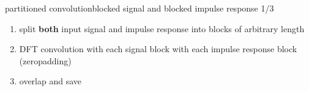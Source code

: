 \begin{frame}{partitioned convolution}{blocked signal and blocked impulse response 1/3}
	\begin{enumerate}
		\item	split \textbf{both} input signal and impulse response into blocks of arbitrary length
		\item	DFT convolution with each signal block with each impulse response block (zeropadding)
		\item	overlap and save
	\end{enumerate}
	\vspace{50mm}
\end{frame}

